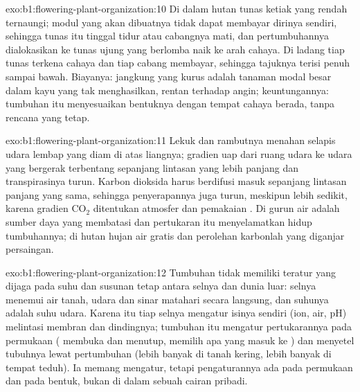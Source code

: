 \begin{solution}{exo:b1:flowering-plant-organization:10}
Di dalam hutan tunas ketiak yang rendah ternaungi; modul yang akan
dibuatnya tidak dapat membayar dirinya sendiri, sehingga tunas itu
tinggal tidur atau cabangnya mati, dan pertumbuhannya dialokasikan ke
tunas ujung yang berlomba naik ke arah cahaya. Di ladang tiap tunas
terkena cahaya dan tiap cabang membayar, sehingga tajuknya terisi penuh
sampai bawah. Biayanya:  jangkung yang kurus adalah tanaman modal
besar dalam kayu yang tak menghasilkan, rentan terhadap angin;
keuntungannya: tumbuhan itu menyesuaikan bentuknya dengan tempat cahaya
berada, tanpa rencana yang tetap.
\end{solution}

\begin{solution}{exo:b1:flowering-plant-organization:11}
Lekuk dan rambutnya menahan selapis udara lembap yang diam di atas
liangnya; gradien uap dari ruang udara ke udara yang bergerak terbentang
sepanjang lintasan yang lebih panjang dan transpirasinya turun. Karbon
dioksida harus berdifusi masuk sepanjang lintasan panjang yang sama,
sehingga penyerapannya juga turun, meskipun lebih sedikit, karena
gradien $\mathrm{CO_2}$ ditentukan atmosfer dan pemakaian . Di
gurun air adalah sumber daya yang membatasi dan pertukaran itu
menyelamatkan hidup tumbuhannya; di hutan hujan air gratis dan perolehan
karbonlah yang diganjar persaingan.
\end{solution}

\begin{solution}{exo:b1:flowering-plant-organization:12}
Tumbuhan tidak memiliki  teratur yang dijaga pada suhu
dan susunan tetap antara selnya dan dunia luar: selnya menemui air
tanah, udara dan sinar matahari secara langsung, dan suhunya adalah suhu
udara. Karena itu tiap selnya mengatur isinya sendiri (ion, air, pH)
melintasi membran dan dindingnya; tumbuhan itu mengatur pertukarannya
pada permukaan ( membuka dan menutup,  memilih apa yang
masuk ke ) dan menyetel tubuhnya lewat pertumbuhan (lebih banyak
 di tanah kering, lebih banyak  di tempat teduh). Ia memang
mengatur, tetapi pengaturannya ada pada permukaan dan pada bentuk, bukan
di dalam sebuah cairan pribadi.
\end{solution}

